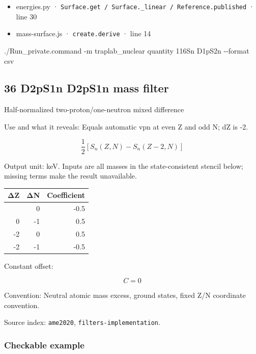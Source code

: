 \documentclass[
  11pt,
  letterpaper,
]{article}
\newenvironment{Shaded}{}{}
\newcommand{\AttributeTok}[1]{\textcolor[rgb]{0.49,0.56,0.16}{#1}}
\newcommand{\ExtensionTok}[1]{#1}
\newcommand{\NormalTok}[1]{#1}
\providecommand{\tightlist}{%
  \setlength{\itemsep}{0pt}\setlength{\parskip}{0pt}}
\begin{document}
\begin{itemize}
\tightlist
\item
  energies.py ·
  \texttt{Surface.get\ /\ Surface.\_linear\ /\ Reference.published} ·
  line 30
\item
  mass-surface.js · \texttt{create.derive} · line 14
\end{itemize}

\begin{Shaded}
\begin{Highlighting}[]
\ExtensionTok{./Run\_private.command} \AttributeTok{{-}m}\NormalTok{ traplab\_nuclear quantity 116Sn D1pS2n }\AttributeTok{{-}{-}format}\NormalTok{ csv}
\end{Highlighting}
\end{Shaded}

\subsection{36 D2pS1n D2pS1n mass
filter}\label{d2ps1n-d2ps1n-mass-filter}

Half-normalized two-proton/one-neutron mixed difference

Use and what it reveals: Equals automatic vpn at even Z and odd N; dZ is
-2.

\[
\frac12[S_n(Z,N)-S_n(Z-2,N)]
\]

Output unit: keV. Inputs are all masses in the state-consistent stencil
below; missing terms make the result unavailable.

\begin{longtable}[]{@{}rrr@{}}
\toprule\noalign{}
ΔZ & ΔN & Coefficient \\
\midrule\noalign{}
\endhead
\bottomrule\noalign{}
\endlastfoot
0 & 0 & -0.5 \\
0 & -1 & 0.5 \\
-2 & 0 & 0.5 \\
-2 & -1 & -0.5 \\
\end{longtable}

Constant offset:

\[
C=0
\]

Convention: Neutral atomic mass excess, ground states, fixed Z/N
coordinate convention.

Source index: \texttt{ame2020}, \texttt{filters-implementation}.

\subsubsection{Checkable example}\label{checkable-example-35}
\end{document}
